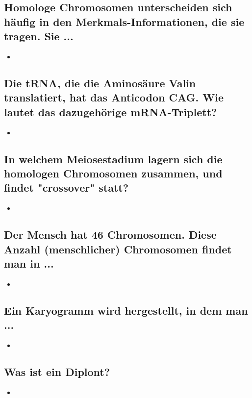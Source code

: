 \documentclass{article}
\begin{document}
\subsection*{Homologe Chromosomen unterscheiden sich häufig in den Merkmals-Informationen, die sie tragen. Sie ...}
\begin{itemize}     \item  \end{itemize}
\subsection*{Die tRNA, die die Aminosäure Valin translatiert, hat das Anticodon CAG.
Wie lautet das dazugehörige mRNA-Triplett?}
\begin{itemize}     \item  \end{itemize}
\subsection*{In welchem Meiosestadium lagern sich die homologen Chromosomen zusammen, und findet "crossover" statt?}
\begin{itemize}     \item  \end{itemize}

\subsection*{Der Mensch hat 46 Chromosomen. Diese Anzahl (menschlicher)
Chromosomen findet man in ...}
\begin{itemize}     \item  \end{itemize}

\subsection*{Ein Karyogramm wird hergestellt, in dem man ...}
\begin{itemize}     \item  \end{itemize}

\subsection*{Was ist ein Diplont?}
\begin{itemize}     \item  \end{itemize}
\end{document}
